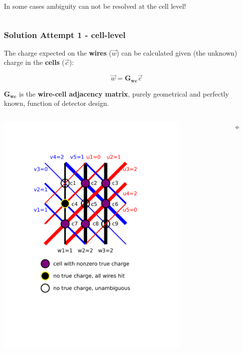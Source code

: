 \documentclass[xcolor=dvipsnames]{beamer}
\begin{document}
\begin{frame}
\begin{columns}
\begin{column}{0.65\textwidth}
      \vspace{5mm}

      In some cases ambiguity can not be resolved at the cell level!

    \end{column}
  \end{columns}
\end{frame}

\begin{frame}[fragile]
  \frametitle{Solution Attempt 1 - cell-level}
  The charge expected on the \textbf{wires} ($\vec{w}$) can be calculated
  given (the unknown) charge in the \textbf{cells} ($\vec{c}$):

  \[\vec{w} = \mathbf{G_{wc}}\vec{c}\]

  $\mathbf{G_{wc}}$ is the \textbf{wire-cell adjacency matrix}, purely
  geometrical and perfectly known, function of detector design.
  
  \begin{columns}
    \begin{column}{0.45\textwidth}
      \vspace{-5mm}

      \flushright \includegraphics[width=0.8\textwidth,trim=1cm 11cm 2cm 2cm,clip]{example-hit-cells.pdf}

    \end{column}
    \begin{column}{0.10\textwidth}
      $\Leftrightarrow$
    \end{column}
    \begin{column}{0.45\textwidth}


\end{column}
\end{columns}
\end{frame}
\end{document}
